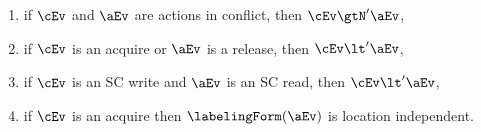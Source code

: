 \begin{definition}
\begin{enumerate}
\item\label{pre-coherence} if $\cEv$ and $\aEv$ are \external actions in conflict,
    then $\cEv \gtN' \aEv$,
\item\label{pre-sync} if $\cEv$ is an acquire or $\aEv$ is a release, then $\cEv \lt' \aEv$, 
\item\label{pre-sc} if $\cEv$ is an SC write and $\aEv$ is an SC read, then $\cEv \lt' \aEv$, 
\item\label{pre-acquire} if $\cEv$ is an acquire then $\labelingForm(\aEv)$
  is location independent.

\end{enumerate}
\end{definition}
